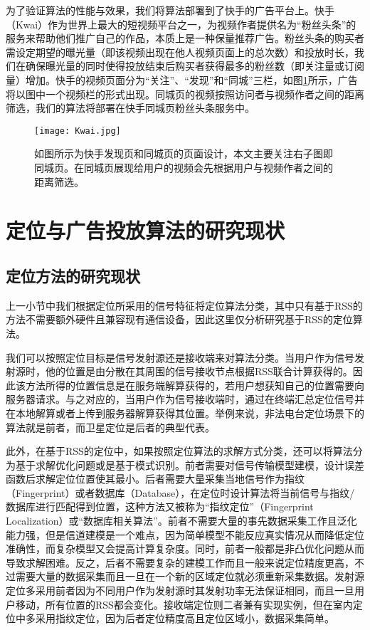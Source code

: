 为了验证算法的性能与效果，我们将算法部署到了快手的广告平台上。快手（Kwai）作为世界上最大的短视频平台之一，为视频作者提供名为“粉丝头条”的服务来帮助他们推广自己的作品，本质上是一种保量推荐广告。粉丝头条的购买者需设定期望的曝光量（即该视频出现在他人视频页面上的总次数）和投放时长，我们在确保曝光量的同时使得投放结束后购买者获得最多的粉丝数（即关注量或订阅量）增加。快手的视频页面分为“关注”、“发现”和“同城”三栏，如图\ref{fig:kwai}所示，广告将以图中一个视频栏的形式出现。同城页的视频按照访问者与视频作者之间的距离筛选，我们的算法将部署在快手同城页粉丝头条服务中。

\begin{figure}[htb]
	\centering
	\texttt{[image: Kwai.jpg]}
	\caption{如图所示为快手发现页和同城页的页面设计，本文主要关注右子图即同城页。在同城页展现给用户的视频会先根据用户与视频作者之间的距离筛选。}
	\label{fig:kwai}
\end{figure}

\section{定位与广告投放算法的研究现状}
\label{sec:first}

\subsection{定位方法的研究现状}

上一小节中我们根据定位所采用的信号特征将定位算法分类，其中只有基于RSS的方法不需要额外硬件且兼容现有通信设备，因此这里仅分析研究基于RSS的定位算法。

我们可以按照定位目标是信号发射源还是接收端来对算法分类。当用户作为信号发射源时，他的位置是由分散在其周围的信号接收节点根据RSS联合计算获得的。因此该方法所得的位置信息是在服务端解算获得的，若用户想获知自己的位置需要向服务器请求。与之对应的，当用户作为信号接收端时，通过在终端汇总定位信号并在本地解算或者上传到服务器解算获得其位置。举例来说，非法电台定位场景下的算法就是前者，而卫星定位是后者的典型代表。

此外，在基于RSS的定位中，如果按照定位算法的求解方式分类，还可以将算法分为基于求解优化问题或是基于模式识别。前者需要对信号传输模型建模，设计误差函数后求解定位位置使其最小。后者需要大量采集当地信号作为指纹（Fingerprint）或者数据库（Database），在定位时设计算法将当前信号与指纹/数据库进行匹配得到位置，这种方法又被称为“指纹定位”（Fingerprint Localization）或“数据库相关算法”。前者不需要大量的事先数据采集工作且泛化能力强，但是信道建模是一个难点，因为简单模型不能反应真实情况从而降低定位准确性，而复杂模型又会提高计算复杂度。同时，前者一般都是非凸优化问题从而导致求解困难。反之，后者不需要复杂的建模工作而且一般来说定位精度更高，不过需要大量的数据采集而且一旦在一个新的区域定位就必须重新采集数据。发射源定位多采用前者因为不同用户作为发射源时其发射功率无法保证相同，而且一旦用户移动，所有位置的RSS都会变化。接收端定位则二者兼有实现实例，但在室内定位中多采用指纹定位，因为后者定位精度高且定位区域小，数据采集简单。


